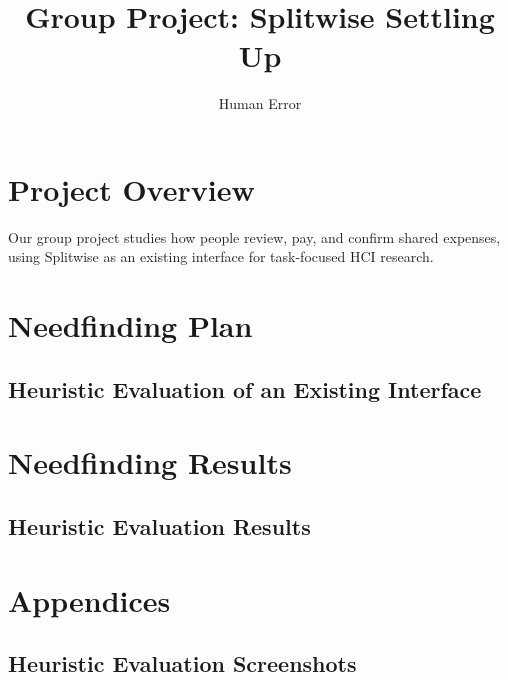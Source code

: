\documentclass[letterpaper]{jdf}
\author{Human Error}
\title{Group Project: Splitwise Settling Up}
\begin{document}
\maketitle

\section{Project Overview}
Our group project studies how people review, pay, and confirm shared expenses, using Splitwise as an existing interface for task-focused HCI research.

\section{Needfinding Plan}
\subsection{}

\subsection{Heuristic Evaluation of an Existing Interface}

\subsection{}

\subsection{}


\section{Needfinding Results}
\subsection{}

\subsection{Heuristic Evaluation Results}

\subsection{}

\subsection{}



\section{Appendices}
\subsection{Heuristic Evaluation Screenshots}




\end{document}
